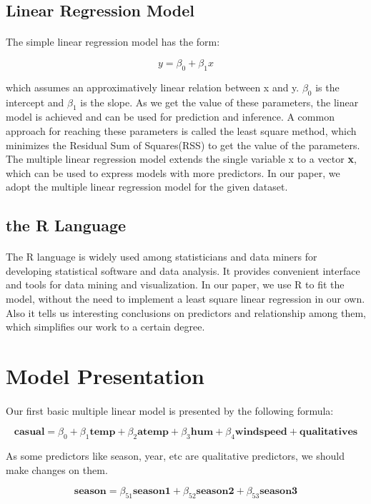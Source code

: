 \documentclass{article}[]
\begin{document}
\subsection{Linear Regression Model}
\label{linear_regression_model}
\paragraph{}
The simple linear regression model has the form:
\begin{center}
$$y = \beta_0 + \beta_1 x$$
\end{center}
which assumes an approximatively linear relation between x and y. $\beta_0$ is the intercept and $\beta_1$ is the slope. As we get the value of these parameters, the linear model is achieved and can be used for prediction and inference. A common approach for reaching these parameters is called the least square method, which minimizes the Residual Sum of Squares(RSS) to get the value of the parameters. The multiple linear regression model extends the single variable x to a vector \textbf{x}, which can be used to express models with more predictors. In our paper, we adopt the multiple linear regression model for the given dataset.
\subsection{the R Language}
\label{the_r_language}
\paragraph{}
The R language is widely used among statisticians and data miners for developing statistical software and data analysis. It provides convenient interface and tools for data mining and visualization. In our paper, we use R to fit the model, without the need to implement a least square linear regression in our own. Also it tells us interesting conclusions on predictors and relationship among them, which simplifies our work to a certain degree.

\section{Model Presentation}
\label{model_presentation}
\paragraph{}
Our first basic multiple linear model is presented by the following formula:
\begin{center}
$$\textbf{casual} = \beta_0+\beta_1\textbf{temp}+\beta_2\textbf{atemp}+\beta_3\textbf{hum}+\beta_4\textbf{windspeed}
+\textbf{qualitatives}$$
\end{center}
As some predictors like season, year, etc are qualitative predictors, we should make changes on them.
\begin{center}
$$\textbf{season} = \beta_{51}\textbf{season1}+\beta_{52}\textbf{season2}+\beta_{53}\textbf{season3}$$
\end{center}
\end{document}
